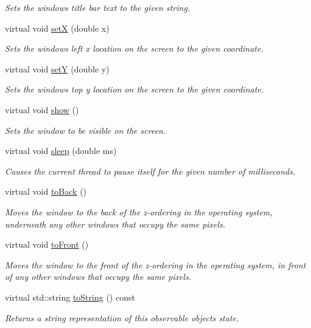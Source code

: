 \begin{DoxyCompactItemize}
\begin{DoxyCompactList}\small\item\em Sets the window\textquotesingle{}s title bar text to the given string. \end{DoxyCompactList}\item 
virtual void \mbox{\hyperlink{classGWindow_a9c18fcc579333bf9653d13ad2b372e39}{setX}} (double x)
\begin{DoxyCompactList}\small\item\em Sets the window\textquotesingle{}s left x location on the screen to the given coordinate. \end{DoxyCompactList}\item 
virtual void \mbox{\hyperlink{classGWindow_a7d57e2a5c35d27feb58fd498a3cf82b9}{setY}} (double y)
\begin{DoxyCompactList}\small\item\em Sets the window\textquotesingle{}s top y location on the screen to the given coordinate. \end{DoxyCompactList}\item 
virtual void \mbox{\hyperlink{classGWindow_a4b148f40a95444d5669406b918ad2f52}{show}} ()
\begin{DoxyCompactList}\small\item\em Sets the window to be visible on the screen. \end{DoxyCompactList}\item 
virtual void \mbox{\hyperlink{classGWindow_aa3381590c1ef33c08000c2fbb2bf0dd0}{sleep}} (double ms)
\begin{DoxyCompactList}\small\item\em Causes the current thread to pause itself for the given number of milliseconds. \end{DoxyCompactList}\item 
virtual void \mbox{\hyperlink{classGWindow_a6053c984b166df7d3db5ee4c4ad65b99}{to\+Back}} ()
\begin{DoxyCompactList}\small\item\em Moves the window to the back of the z-\/ordering in the operating system, underneath any other windows that occupy the same pixels. \end{DoxyCompactList}\item 
virtual void \mbox{\hyperlink{classGWindow_a48a9c646659814220ac869bbcb60b52c}{to\+Front}} ()
\begin{DoxyCompactList}\small\item\em Moves the window to the front of the z-\/ordering in the operating system, in front of any other windows that occupy the same pixels. \end{DoxyCompactList}\item 
virtual std\+::string \mbox{\hyperlink{classGObservable_a1fe5121d6528fdea3f243321b3fa3a49}{to\+String}} () const
\begin{DoxyCompactList}\small\item\em Returns a string representation of this observable object\textquotesingle{}s state. \end{DoxyCompactList}\end{DoxyCompactItemize}
